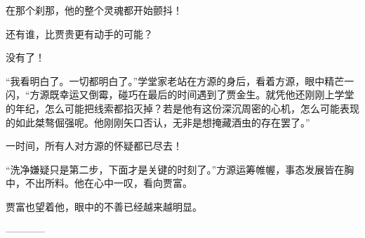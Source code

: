 \begin{this_body}
在那个刹那，他的整个灵魂都开始颤抖！

还有谁，比贾贵更有动手的可能？

没有了！

“我看明白了。一切都明白了。”学堂家老站在方源的身后，看着方源，眼中精芒一闪，“方源既幸运又倒霉，碰巧在最后的时间遇到了贾金生。就凭他还刚刚上学堂的年纪，怎么可能把线索都掐灭掉？若是他有这份深沉周密的心机，怎么可能表现的如此桀骜倔强呢。他刚刚矢口否认，无非是想掩藏酒虫的存在罢了。”

一时间，所有人对方源的怀疑都已尽去！

“洗净嫌疑只是第二步，下面才是关键的时刻了。”方源运筹帷幄，事态发展皆在胸中，不出所料。他在心中一叹，看向贾富。

贾富也望着他，眼中的不善已经越来越明显。

------------

\end{this_body}

